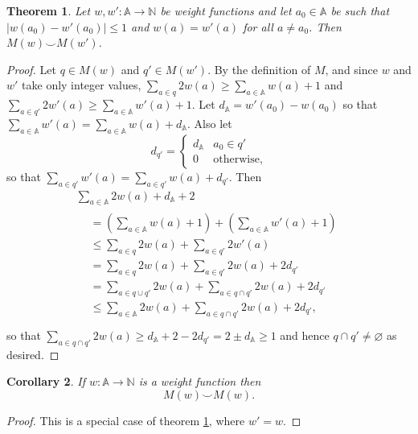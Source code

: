 \documentclass[journal]{IEEEtran}
\newtheorem{theorem}{Theorem}
\newtheorem{corollary}[theorem]{Corollary}
\begin{document}
\begin{theorem} \label{weights-nearly-equal} Let $w, w' : \mathbb A \to \mathbb
N$ be weight functions and let $a_0 \in \mathbb A$ be such that $|w(a_0) -
w'(a_0)| \le 1$ and $w(a) = w'(a)$ for all $a \ne a_0$. Then $M(w) \smile
M(w')$.  \end{theorem}

\begin{proof} Let $q \in M(w)$ and $q' \in M(w')$. By the
  definition of $M$, and since $w$ and $w'$ take only integer values,
%
$\sum_{a \in q} 2 w(a) \ge \sum_{a \in \mathbb A} w(a) + 1$
%
and
%
$\sum_{a \in q'} 2 w'(a) \ge \sum_{a \in \mathbb A} w'(a) + 1$.
%
Let $d_{\mathbb A} = w'(a_0) - w(a_0)$ so that $\sum_{a \in \mathbb A} w'(a) =
\sum_{a \in \mathbb A} w(a) + d_{\mathbb A}$. Also let \[
d_{q'} =
\begin{cases}
%
d_{\mathbb A} & a_0 \in q' \\
%
0 & \textrm{otherwise,}
%
\end{cases}
\]
so that $\sum_{a \in q'} w'(a) = \sum_{a \in q'} w(a) + d_{q'}$.
%
Then
\begin{gather*}
%
\sum_{a \in \mathbb A} 2w(a) + d_{\mathbb A} + 2 \\
%
\begin{aligned}
%
&= \left( \sum_{a \in \mathbb A} w(a)  + 1\right)
+  \left( \sum_{a \in \mathbb A} w'(a) + 1\right) \\
%
&\le \sum_{a \in q}  2w(a)
+    \sum_{a \in q'} 2w'(a) \\
%
&= \sum_{a \in q}  2w(a)
+  \sum_{a \in q'} 2w(a) + 2d_{q'}\\
%
&= \sum_{a \in q \cup q'} 2w(a)
+  \sum_{a \in q \cap q'} 2w(a) + 2d_{q'}\\
%
&\le \sum_{a \in \mathbb A} 2w(a)
+    \sum_{a \in q \cap q'} 2w(a) + 2d_{q'},\\
%
\end{aligned}\end{gather*} so that $\sum_{a \in q \cap q'} 2w(a) \ge d_{\mathbb
A} + 2 - 2d_{q'} = 2 \pm d_\mathbb A \ge 1$ and hence $q \cap q' \ne \varnothing$ as desired.
\end{proof}

\begin{corollary} \label{weights-equal} If $w : \mathbb A \to \mathbb N$ is a
weight function then \[M(w) \smile M(w).\]  \end{corollary}

\begin{proof}
This is a special case of theorem \ref{weights-nearly-equal}, where $w' = w$.
\end{proof}
\end{document}
